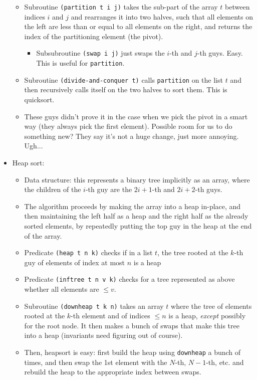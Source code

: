 \begin{itemize}
\begin{itemize}
	\item Subroutine \verb|(partition t i j)| takes the sub-part of the array $t$ between indices $i$ and $j$ and rearranges it into two halves, such that all elements on the left are less than or equal to all elements on the right, and returns the index of the partitioning element (the pivot).
	\begin{itemize}
	\item Subsubroutine \verb|(swap i j)| just swaps the $i$-th and $j$-th guys. Easy. This is useful for \verb|partition|.
\end{itemize}
	\item Subroutine \verb|(divide-and-conquer t)| calls \verb|partition| on the list $t$ and then recursively calls itself on the two halves to sort them. This is quicksort.
	\item These guys didn't prove it in the case when we pick the pivot in a smart way (they always pick the first element). Possible room for us to do something new? They say it's not a huge change, just more annoying. Ugh...
\end{itemize}
\item Heap sort:
\begin{itemize}
	\item Data structure: this represents a binary tree implicitly as an array, where the children of the $i$-th guy are the $2i+1$-th and $2i+2$-th guys. 
	\item The algorithm proceeds by making the array into a heap in-place, and then maintaining the left half as a heap and the right half as the already sorted elements, by repeatedly putting the top guy in the heap at the end of the array.
	\item Predicate \verb|(heap t n k)| checks if in a list $t$, the tree rooted at the $k$-th guy of elements of index at most $n$ is a heap
	\item Predicate \verb|(inftree t n v k)| checks for a tree represented as above whether all elements are $\leq v$.
	\item Subroutine \verb|(downheap t k n)| takes an array $t$ where the tree of elements rooted at the $k$-th element and of indices $\leq n$ is a heap, \emph{except} possibly for the root node. It then makes a bunch of swaps that make this tree into a heap (invariants need figuring out of course).
	\item Then, heapsort is easy: first build the heap using \verb|downheap| a bunch of times, and then swap the 1st element with the $N$-th, $N-1$-th, etc. and rebuild the heap to the appropriate index between swaps.
\end{itemize}
\end{itemize}

